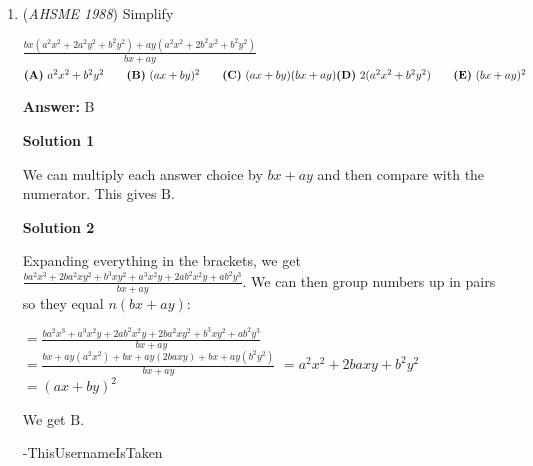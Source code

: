 \begin{enumerate}
 $\textbf{(A)}\ 10\qquad \textbf{(B)}\ 16\qquad \textbf{(C)}\ 24\qquad \textbf{(D)}\ 120\qquad \textbf{(E)}\ \text{none of these}$

 \textbf{Answer: }B



\textbf{Solution}

We have $2$ choices for who wins the first game, and that uniquely determines $5^{\text{th}}$ place. Then there are $2$ choices for a next game and that uniquely determines $4^{\text{th}}$ place, followed by $2$ choices for the next game that uniquely determines $3^{\text{rd}}$ place. Finally, there are $2$ choices for the last game, which uniquely determines both $1^{\text{st}}$ and $2^{\text{nd}}$ places, since the winner is $1^{\text{st}}$ and the loser is $2^{\text{nd}}$. Thus the number of possible orders is $2 \times 2 \times 2 \times 2 = 16$, which is $\boxed{\text{B}}$.

 See Volume I Chapter 25, p. 234-235

 


	\item (\textit{AHSME 1988}) Simplify


 $\frac{bx(a^2x^2 + 2a^2y^2 + b^2y^2) + ay(a^2x^2 + 2b^2x^2 + b^2y^2)}{bx + ay}$
$\textbf{(A)}\ a^2x^2 + b^2y^2\qquad \textbf{(B)}\ (ax + by)^2\qquad \textbf{(C)}\ (ax + by)(bx + ay)\qquad\\ \textbf{(D)}\ 2(a^2x^2+b^2y^2)\qquad \textbf{(E)}\ (bx+ay)^2$

 \textbf{Answer: }B



\textbf{Solution 1}

We can multiply each answer choice by $bx + ay$ and then compare with the numerator. This gives $\boxed{\text{B}}$.

 



\textbf{Solution 2}

Expanding everything in the brackets, we get$\frac{ba^2x^3 + 2ba^2xy^2 + b^3xy^2 + a^3x^2y + 2ab^2x^2y + ab^2y^3}{bx + ay}$. We can then group numbers up in pairs so they equal $n(bx + ay)$:

 $= \frac{ba^2x^3 + a^3x^2y + 2ab^2x^2y + 2ba^2xy^2 + b^3xy^2 + ab^2y^3}{bx+ay}$
$= \frac{bx + ay(a^2x^2) + bx + ay(2baxy) + bx + ay(b^2y^2)}{bx+ay}$
$= a^2x^2 + 2baxy + b^2y^2$
$= (ax + by)^2$

 We get $\boxed{\text{B}}$.

 -ThisUsernameIsTaken


\end{enumerate}
